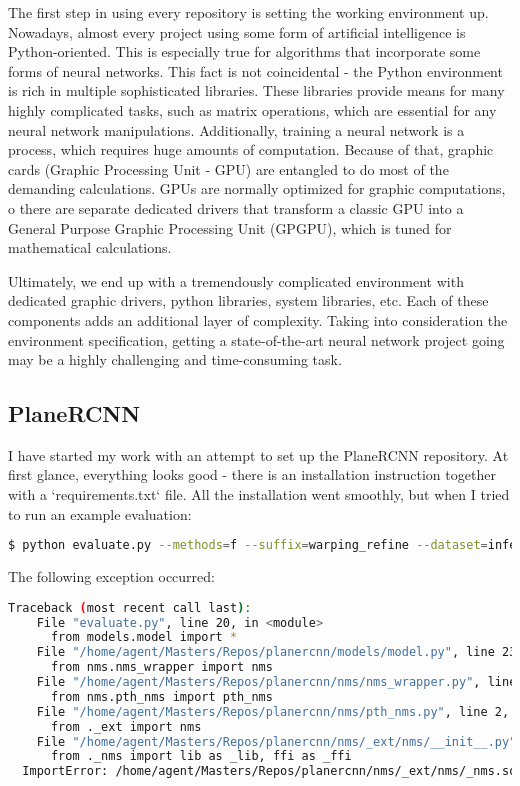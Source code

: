 The first step in using every repository is setting the working environment up.
Nowadays, almost every project using some form of artificial intelligence is Python-oriented.
This is especially true for algorithms that incorporate some forms of neural networks.
This fact is not coincidental - the Python environment is rich in multiple sophisticated libraries.
These libraries provide means for many highly complicated tasks, such as matrix operations,
which are essential for any neural network manipulations.
Additionally, training a neural network is a process, which requires huge amounts of computation.
Because of that, graphic cards (Graphic Processing Unit - GPU)
are entangled to do most of the demanding calculations.
GPUs are normally optimized for graphic computations, 
o there are separate dedicated drivers that transform a classic GPU
into a General Purpose Graphic Processing Unit (GPGPU),
which is tuned for mathematical calculations.

\par

Ultimately, we end up with a tremendously complicated environment with
dedicated graphic drivers, python libraries, system libraries, etc.
Each of these components adds an additional layer of complexity.
Taking into consideration the environment specification,
getting a state-of-the-art neural network project going may be a highly challenging and time-consuming task.

\subsection{PlaneRCNN} \label{subsec:planercnn}

I have started my work with an attempt to set up the PlaneRCNN repository. \cite{planercnn-repository}
At first glance, everything looks good - there is an installation instruction together with a `requirements.txt` file.
All the installation went smoothly, but when I tried to run an example evaluation:
\begin{lstlisting}[language=bash,basicstyle=\small]
    $ python evaluate.py --methods=f --suffix=warping_refine --dataset=inference --customDataFolder=example_images
\end{lstlisting}
The following exception occurred:
\begin{lstlisting}[language=bash,basicstyle=\tiny]
    Traceback (most recent call last):
    File "evaluate.py", line 20, in <module>
      from models.model import *
    File "/home/agent/Masters/Repos/planercnn/models/model.py", line 23, in <module>
      from nms.nms_wrapper import nms
    File "/home/agent/Masters/Repos/planercnn/nms/nms_wrapper.py", line 11, in <module>
      from nms.pth_nms import pth_nms
    File "/home/agent/Masters/Repos/planercnn/nms/pth_nms.py", line 2, in <module>
      from ._ext import nms
    File "/home/agent/Masters/Repos/planercnn/nms/_ext/nms/__init__.py", line 3, in <module>
      from ._nms import lib as _lib, ffi as _ffi
  ImportError: /home/agent/Masters/Repos/planercnn/nms/_ext/nms/_nms.so: undefined symbol: __cudaRegisterFatBinaryEnd
\end{lstlisting}

